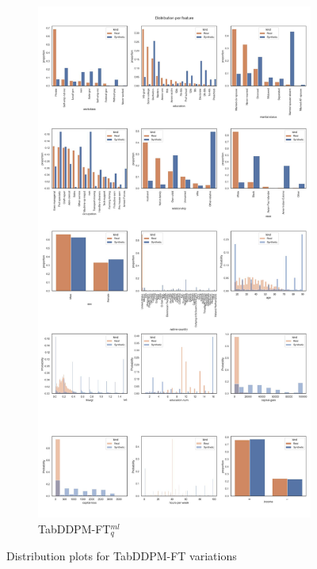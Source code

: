 \begin{landscape}
\begin{figure}[h]
\begin{subfigure}{0.3\linewidth}
			\includegraphics[height=\textheight,width=\linewidth,keepaspectratio]{images/distributions_full/tab-ddpm-ft-simTune.jpg}
			\caption{TabDDPM-FT$^{ml}_q$}
		\end{subfigure}
		\caption[Distribution plots TabDDPM-FT and -BGM Models]{Distribution plots for TabDDPM-FT variations}
		\label{fig_a:dist_5}
	\end{figure}
\end{landscape}



